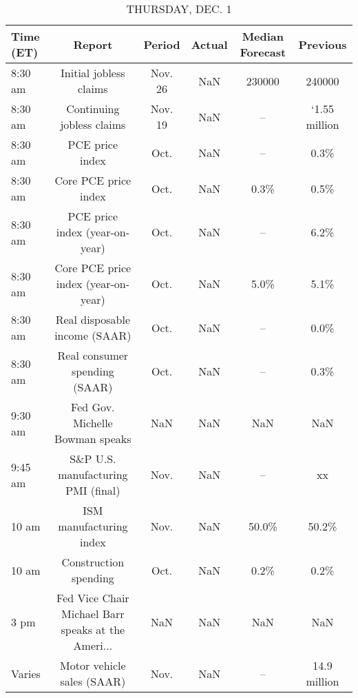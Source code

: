 \documentclass{article}%
\begin{document}
%


\begin{table}[htbp]%
\caption{THURSDAY, DEC. 1}%
\centering%
\begin{adjustbox}{width=1\textwidth}%
\begin{tabular}{lccccc}
\toprule
Time (ET) &                                             Report &  Period & Actual & Median Forecast &      Previous \\
\midrule
  8:30 am &                             Initial jobless claims & Nov. 26 &    NaN &          230000 &        240000 \\
  8:30 am &                          Continuing jobless claims & Nov. 19 &    NaN &              -- & `1.55 million \\
  8:30 am &                                    PCE price index &    Oct. &    NaN &              -- &          0.3\% \\
  8:30 am &                               Core PCE price index &    Oct. &    NaN &            0.3\% &          0.5\% \\
  8:30 am &                     PCE price index (year-on-year) &    Oct. &    NaN &              -- &          6.2\% \\
  8:30 am &                Core PCE price index (year-on-year) &    Oct. &    NaN &            5.0\% &          5.1\% \\
  8:30 am &                      Real disposable income (SAAR) &    Oct. &    NaN &              -- &          0.0\% \\
  8:30 am &                      Real consumer spending (SAAR) &    Oct. &    NaN &              -- &          0.3\% \\
  9:30 am &                    Fed Gov. Michelle Bowman speaks &     NaN &    NaN &             NaN &           NaN \\
  9:45 am &                 S\&P U.S. manufacturing PMI (final) &    Nov. &    NaN &              -- &            xx \\
    10 am &                            ISM manufacturing index &    Nov. &    NaN &           50.0\% &         50.2\% \\
    10 am &                              Construction spending &    Oct. &    NaN &            0.2\% &          0.2\% \\
     3 pm & Fed Vice Chair Michael Barr speaks at the Ameri... &     NaN &    NaN &             NaN &           NaN \\
   Varies &                         Motor vehicle sales (SAAR) &    Nov. &    NaN &              -- &  14.9 million \\
\bottomrule
\end{tabular}
%
\end{adjustbox}%
\end{table}
\end{document}
